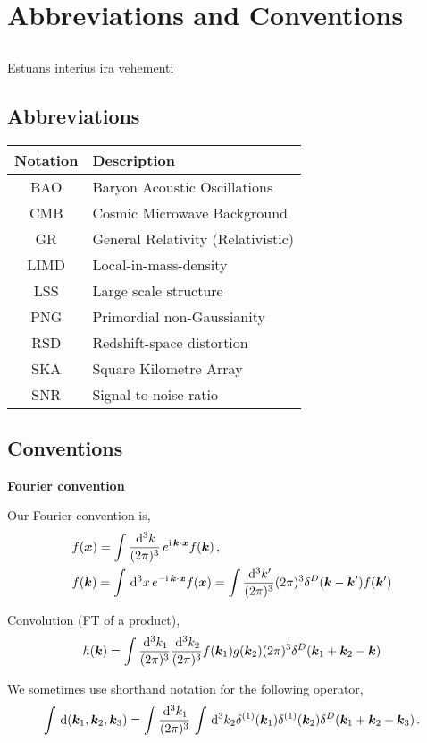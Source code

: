 \chapter*{Abbreviations and Conventions}
\label{chapter:conventions}
\section*{}
\singlespacing

Estuans interius ira vehementi

\section*{Abbreviations}
\setlength{\tabcolsep}{14pt}
\begin{center}
\begin{tabular}{c | l}
	\textbf{Notation} & \textbf{Description} \\
	\hline
	BAO & Baryon Acoustic Oscillations \\
	CMB & Cosmic Microwave Background \\
	GR & General Relativity (Relativistic) \\
	LIMD & Local-in-mass-density \\
	LSS & Large scale structure \\
	PNG & Primordial non-Gaussianity \\
	RSD & Redshift-space distortion \\
	SKA & Square Kilometre Array \\
	SNR & Signal-to-noise ratio 
\end{tabular}
\end{center}
\section*{Conventions}

\textbf{Fourier convention}


Our Fourier convention is, 
\begin{align*}
	&f(\bm {x}) = \int \frac{\,\mathrm{d}^3 k}{(2\pi)^3}\, e^{\mathrm{i\,} \bm {k} \cdot \bm {x}} f(\bm {k})\,,\\
	&f(\bm {k}) = \int \,\mathrm{d}^3x\, e^{- \mathrm{i\,} \bm {k}\cdot\bm {x}} f(\bm {x}) = \int \frac{\,\mathrm{d}^3 k'}{(2\pi)^3} (2\pi)^3 \delta^D(\bm {k}-\bm {k}') f(\bm {k}')
\end{align*}

Convolution (FT of a product), 
\begin{equation}
	h(\bm {k}) = \int \frac{\,\mathrm{d}^3k_1}{(2\pi)^3} \frac{\,\mathrm{d}^3k_2}{(2\pi)^3} f(\bm {k}_1) g(\bm {k}_2) (2\pi)^3 \delta^D(\bm {k}_1 +\bm {k}_2 - \bm {k})
\end{equation}

We sometimes use shorthand notation for the following operator, 
\begin{equation}
	\int\,\mathrm{d}(\bm {k}_1,\bm {k}_2,\bm {k}_3)= \int\frac{\,\mathrm{d}^3k_1}{(2\pi)^3}\, \int \,\mathrm{d}^3 k_2 \delta^{(1)}(\bm {k}_1) \delta^{(1)}(\bm {k}_2) \delta^D(\bm {k}_1+\bm {k}_2-\bm {k}_3)\,.
\end{equation}



